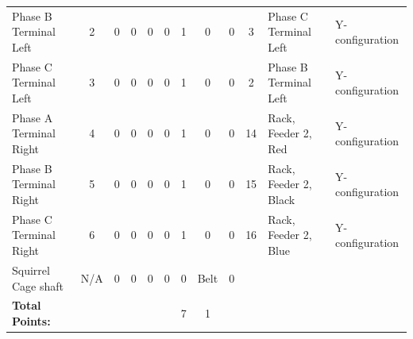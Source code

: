 \begin{table}[!htp]
{\begin{tabular}{lcccccccccll}
			Phase B Terminal Left                        & 2                       & 0                                           & 0                                          & 0           & 0           & 1            & 0                & 0 & 3                            & Phase C Terminal Left            & Y-configuration \\
			Phase C Terminal Left                        & 3                       & 0                                           & 0                                          & 0           & 0           & 1            & 0                & 0 & 2                            & Phase B Terminal Left            & Y-configuration \\
			Phase A Terminal Right                       & 4                       & 0                                           & 0                                          & 0           & 0           & 1            & 0                & 0 & 14                           & Rack, Feeder 2, Red              & Y-configuration \\
			Phase B Terminal Right                       & 5                       & 0                                           & 0                                          & 0           & 0           & 1            & 0                & 0 & 15                           & Rack, Feeder 2, Black            & Y-configuration \\
			Phase C Terminal Right                       & 6                       & 0                                           & 0                                          & 0           & 0           & 1            & 0                & 0 & 16                           & Rack, Feeder 2, Blue             & Y-configuration \\
			Squirrel Cage shaft                          & N/A                     & 0                                           & 0                                          & 0           & 0           & 0            & Belt             & 0 &                              &                                  &                 \\ \bottomrule
			\textbf{Total Points:}                       &                         &                                             &                                            &             &             & 7            & 1                &   &                              &                                  &                 \\ \bottomrule
		\end{tabular}
	}
\end{table}
